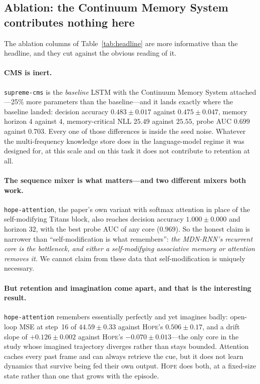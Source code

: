 \documentclass[11pt,a4paper]{article}
\newcommand{\code}[1]{\texttt{\small #1}}
\begin{document}
\subsection{Ablation: the Continuum Memory System contributes nothing here}
\label{sec:ablation}

The ablation columns of Table~\ref{tab:headline} are more informative than the
headline, and they cut against the obvious reading of it.

\paragraph{CMS is inert.} \code{supreme-cms} is the \emph{baseline} LSTM with the
Continuum Memory System attached---25\% more parameters than the baseline---and
it lands exactly where the baseline landed: decision accuracy $0.483\pm0.017$
against $0.475\pm0.047$, memory horizon $4$ against $4$, memory-critical NLL
$25.49$ against $25.55$, probe AUC $0.699$ against $0.703$. Every one of those
differences is inside the seed noise. Whatever the multi-frequency knowledge
store does in the language-model regime it was designed for, at this scale and on
this task it does not contribute to retention at all.

\paragraph{The sequence mixer is what matters---and two different mixers both
work.} \code{hope-attention}, the paper's own variant with softmax attention in
place of the self-modifying Titans block, also reaches decision accuracy
$1.000\pm0.000$ and horizon $32$, with the best probe AUC of any core ($0.969$).
So the honest claim is narrower than ``self-modification is what remembers'':
\emph{the MDN-RNN's recurrent core is the bottleneck, and either a self-modifying
associative memory or attention removes it.} We cannot claim from these data that
self-modification is uniquely necessary.

\paragraph{But retention and imagination come apart, and that is the interesting
result.} \code{hope-attention} remembers essentially perfectly and yet imagines
badly: open-loop MSE at step~16 of $44.59\pm0.33$ against \textsc{Hope}'s
$0.506\pm0.17$, and a drift slope of $+0.126\pm0.002$ against \textsc{Hope}'s
$-0.070\pm0.013$---the only core in the study whose imagined trajectory diverges
rather than stays bounded. Attention caches every past frame and can always
retrieve the cue, but it does not learn dynamics that survive being fed their own
output. \textsc{Hope} does both, at a fixed-size state rather than one that grows
with the episode.
\end{document}
